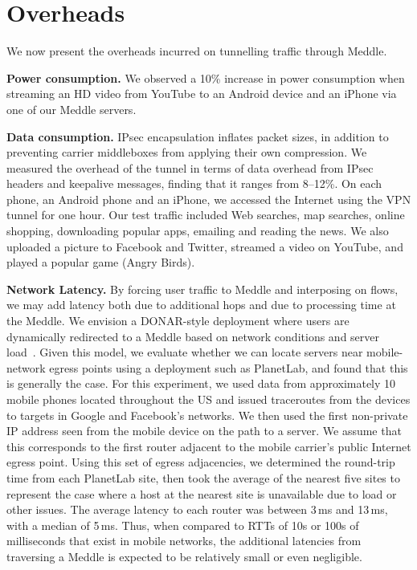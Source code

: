 \documentclass{sig-alternate-10pt}
\newcommand{\meddle}{{Meddle}\xspace}
\begin{document}

\section{Overheads}

We now present the overheads incurred on tunnelling traffic through
\meddle.

\noindent\textbf{Power consumption.} We observed a 10\% increase in
power consumption when streaming an HD video from YouTube to an
Android device and an iPhone via one of our \meddle servers.  

\noindent\textbf{Data consumption.} IPsec encapsulation inflates
packet sizes, in addition to preventing carrier middleboxes from
applying their own compression. We measured the overhead of the 
tunnel in terms of data overhead from IPsec headers and keepalive
messages, finding that it ranges from 8--12\%. On each phone, an
Android phone and an iPhone, we accessed the Internet using the VPN
tunnel for one hour. Our test traffic included Web searches, map 
searches, online shopping, downloading popular apps, emailing and
reading the news. We also uploaded a picture to Facebook and Twitter, 
streamed a video on YouTube, and played a popular game (Angry Birds).

\noindent\textbf{Network Latency.} By forcing user traffic to \meddle 
and interposing on flows, we may add latency both due to additional
hops and due to processing time at the \meddle. We envision a
DONAR-style deployment where users are dynamically redirected to a
\meddle based on network conditions and server
load~\cite{wendell:donar}. Given this model, we evaluate whether we
can locate servers near mobile-network egress points using a
deployment such as PlanetLab, and found that this is generally the
case. For this experiment, we used data from approximately 10 mobile
phones located throughout the US and issued traceroutes from the
devices to targets in Google and Facebook's networks. We then used the
first non-private IP address seen from the mobile device on the path
to a server. We assume that this corresponds to the first router
adjacent to the mobile carrier's public Internet egress point. Using
this set of egress adjacencies, we determined the round-trip time from
each PlanetLab site, then took the average of the nearest five sites
to represent the case where a host at the nearest site is unavailable
due to load or other issues. The average latency to each router was
between 3\,ms and 13\,ms, with a median of 5\,ms. Thus, when compared
to RTTs of 10s or 100s of  milliseconds that exist in mobile networks,
the additional latencies from traversing a \meddle is expected to be
relatively small or even negligible. 
\end{document}
